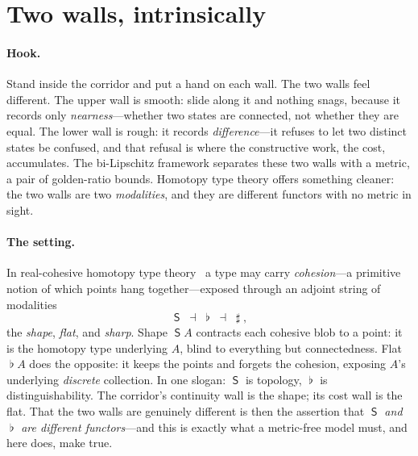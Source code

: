 \documentclass[11pt,letterpaper]{article}
\theoremstyle{plain}
\theoremstyle{definition}
\theoremstyle{remark}
\newcommand{\shapeM}{\mathop{\mathsf{S}}\nolimits}      %
\newcommand{\flatM}{\mathop{\flat}\nolimits}            %
\newcommand{\sharpM}{\mathop{\sharp}\nolimits}          %
\begin{document}
\section{Two walls, intrinsically}\label{sec:cohesion}

\paragraph{Hook.}
Stand inside the corridor and put a hand on each wall. The two walls feel
different. The upper wall is smooth: slide along it and nothing snags, because it
records only \emph{nearness}---whether two states are connected, not whether they
are equal. The lower wall is rough: it records \emph{difference}---it refuses to
let two distinct states be confused, and that refusal is where the constructive
work, the cost, accumulates. The bi-Lipschitz framework separates these two walls
with a metric, a pair of golden-ratio bounds. Homotopy type theory offers
something cleaner: the two walls are two \emph{modalities}, and they are different
functors with no metric in sight.

\paragraph{The setting.}
In real-cohesive homotopy type theory~\citep{shulman2018brouwer} a type may carry
\emph{cohesion}---a primitive notion of which points hang together---exposed
through an adjoint string of modalities
\begin{equation}\label{eq:cohesion-adjoint}
  \shapeM \;\dashv\; \flatM \;\dashv\; \sharpM,
\end{equation}
the \emph{shape}, \emph{flat}, and \emph{sharp}. Shape $\shapeM A$ contracts each
cohesive blob to a point: it is the homotopy type underlying $A$, blind to
everything but connectedness. Flat $\flatM A$ does the opposite: it keeps the
points and forgets the cohesion, exposing $A$'s underlying \emph{discrete}
collection. In one slogan: $\shapeM$ is topology, $\flatM$ is
distinguishability. The corridor's continuity wall is the shape; its cost wall is
the flat. That the two walls are genuinely different is then the assertion that
\emph{$\shapeM$ and $\flatM$ are different functors}---and this is exactly what a
metric-free model must, and here does, make true.
\end{document}
